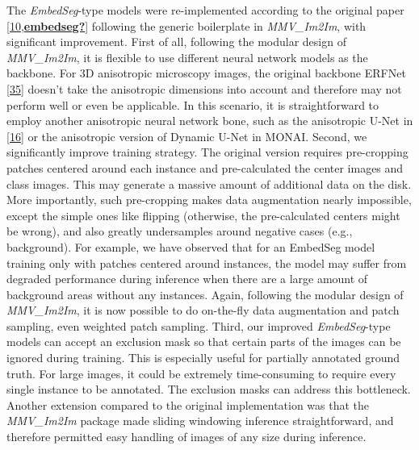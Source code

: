 The \emph{EmbedSeg}-type models were re-implemented according to the original paper {[}\protect\hyperlink{ref-K2ugNcVa}{10},\protect\hyperlink{ref-embedseg}{\textbf{embedseg?}}{]} following the generic boilerplate in \emph{MMV\_Im2Im}, with significant improvement. First of all, following the modular design of \emph{MMV\_Im2Im}, it is flexible to use different neural network models as the backbone. For 3D anisotropic microscopy images, the original backbone ERFNet {[}\protect\hyperlink{ref-XAkgs3Nh}{35}{]} doesn't take the anisotropic dimensions into account and therefore may not perform well or even be applicable. In this scenario, it is straightforward to employ another anisotropic neural network bone, such as the anisotropic U-Net in {[}\protect\hyperlink{ref-jM3v1UjQ}{16}{]} or the anisotropic version of Dynamic U-Net in MONAI. Second, we significantly improve training strategy. The original version requires pre-cropping patches centered around each instance and pre-calculated the center images and class images. This may generate a massive amount of additional data on the disk. More importantly, such pre-cropping makes data augmentation nearly impossible, except the simple ones like flipping (otherwise, the pre-calculated centers might be wrong), and also greatly undersamples around negative cases (e.g., background). For example, we have observed that for an EmbedSeg model training only with patches centered around instances, the model may suffer from degraded performance during inference when there are a large amount of background areas without any instances. Again, following the modular design of \emph{MMV\_Im2Im}, it is now possible to do on-the-fly data augmentation and patch sampling, even weighted patch sampling. Third, our improved \emph{EmbedSeg}-type models can accept an exclusion mask so that certain parts of the images can be ignored during training. This is especially useful for partially annotated ground truth. For large images, it could be extremely time-consuming to require every single instance to be annotated. The exclusion masks can address this bottleneck. Another extension compared to the original implementation was that the \emph{MMV\_Im2Im} package made sliding windowing inference straightforward, and therefore permitted easy handling of images of any size during inference.

